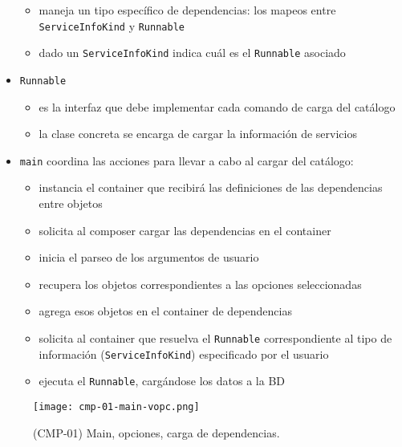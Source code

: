 \begin{itemize}
\begin{itemize}
      \item maneja un tipo espec\'ifico de dependencias:
            los mapeos entre \verb|ServiceInfoKind| y \verb|Runnable|
      \item dado un \verb|ServiceInfoKind| indica cu\'al es el \verb|Runnable| asociado
      \end{itemize}
    \item \verb|Runnable| 
      \begin{itemize}
      \item es la interfaz que debe implementar cada comando de carga del cat\'alogo
      \item la clase concreta se encarga de cargar la informaci\'on de servicios
      \end{itemize}
    \item \verb|main| coordina las acciones para llevar a cabo al cargar del cat\'alogo:
      \begin{itemize}
      \item instancia el container que recibir\'a las definiciones de las dependencias 
            entre objetos
      \item solicita al composer cargar las dependencias en el container
      \item inicia el parseo de los argumentos de usuario
      \item recupera los objetos correspondientes a las opciones seleccionadas
      \item agrega esos objetos en el container de dependencias
      \item solicita al container que resuelva el \verb|Runnable| correspondiente 
            al tipo de informaci\'on (\verb|ServiceInfoKind|) especificado por el usuario
      \item ejecuta el \verb|Runnable|, carg\'andose los datos a la BD
      \end{itemize}
\end{itemize}


\begin{figure}[hbt]
  \centering
  \texttt{[image: cmp-01-main-vopc.png]}
  \caption{(CMP-01) Main, opciones, carga de dependencias.}
  \label{fig:cmp01-main}
\end{figure}

